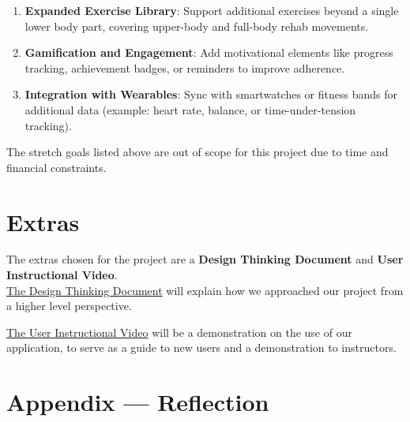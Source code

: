 \documentclass{article}
\begin{document}
\begin{enumerate}
  \item \textbf{Expanded Exercise Library}: Support additional exercises beyond a single lower body part, covering upper-body and full-body rehab movements.
  
  \item \textbf{Gamification and Engagement}: Add motivational elements like progress tracking, achievement badges, or reminders to improve adherence.
  
  \item \textbf{Integration with Wearables}: Sync with smartwatches or fitness bands for additional data (example: heart rate, balance, or time-under-tension tracking).

\end{enumerate}

The stretch goals listed above are out of scope for this project due to time and financial constraints.

\section{Extras}

The extras chosen for the project are a \textbf{Design Thinking Document}
and \textbf{User Instructional Video}. \\

\underline{The Design Thinking Document} will explain how we approached our project
from a higher level perspective. 

\underline{The User Instructional Video} will be a demonstration on the use of our
application, to serve as a guide to new users and a demonstration to
instructors.\\

\newpage{}

\section*{Appendix --- Reflection}
\end{document}
